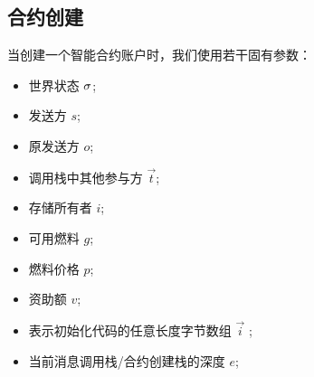 

\subsection{合约创建}
\label{sec:creation}

当创建一个智能合约账户时，我们使用若干固有参数：
\begin{itemize}[nosep]
	\item 世界状态 ${\mathbf{\sigma}}$;
	
	\item 发送方 $s$;

	\item 原发送方 $o$;
	
	\item 调用栈中其他参与方 $\vec{t}$;
	
	\item 存储所有者 $i$;
		
	\item 可用燃料 $g$;


	\item 燃料价格 $p$;

	\item 资助额 $v$;

	\item 表示初始化代码的任意长度字节数组 $\vec{i}$ ;

	\item 当前消息调用栈/合约创建栈的深度 $e$;


\end{itemize}
